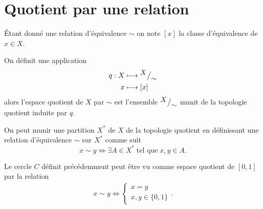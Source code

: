 \documentclass[main.tex]{subfiles}
\begin{document}
	\section{Quotient par une relation}
	Étant donné une relation d'équivalence $\sim$ on note $[x]$ la classe d'équivalence de  $x \in X$.
	\begin{definition}
		On définit une application
		\begin{align*}
			q : X &\longmapsto {^{\textstyle X}\big/_{\textstyle \sim}} \\
			x &\longmapsto [x]
		\end{align*}
		alors l'espace quotient de $X$ par $\sim$ est l'ensemble ${^{\textstyle X}\big/_{\textstyle \sim}}$ munit de la topologie quotient induite par $q$.
	\end{definition}
	\begin{remark}
		On peut munir une partition $X^*$ de $X$ de la topologie quotient en définissant une relation d'équivalence $\sim$ sur  $X^*$ comme suit \[
			x \sim y \iff \exists A \in X^* \; \text{tel que} \; x,y \in A
		.\] 
	\end{remark}
	\begin{example}
		Le cercle $C$ définit précédemment peut être vu comme espace quotient de $[0,1]$ par la relation 
		 \begin{align*}
			x \sim y \iff \begin{cases}
				x = y \\
				x,y \in \{0,1\}
			\end{cases}
		.\end{align*}
	\end{example}
\end{document}
